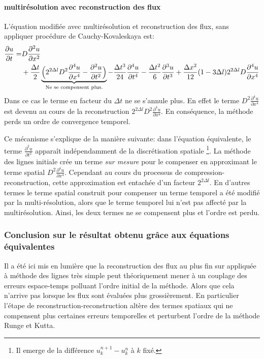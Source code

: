     \paragraph{multirésolution avec reconstruction des flux}
        L'équation modifiée avec multirésolution et reconstruction des flux, sans appliquer procédure de Cauchy-Kovaleskaya est:
        \begin{align}
            \frac{\partial u}{\partial  t} =&D \frac{\partial^{2} u}{\partial x^{2}}\\\notag
            &+ \frac{\Delta t}{2} \underbrace{\Bigl(2^{2 \Delta l} D^{2}           \frac{\partial^{4} u}{\partial x^{4}} -\frac{\partial^{2} u}{\partial t^{2}} \Bigr)}_{\text{Ne se compensent plus.}}
            -\frac{\Delta t^{3}}{24}                          \frac{\partial^{4} u}{\partial t^{4}} 
            - \frac{\Delta t^{2}}{6}                           \frac{\partial^{3} u}{\partial t^{3}}
            +\frac{\Delta x^{2}}{12} (1 - 3\Delta l)    2^{2 \Delta l} D \frac{\partial^{4} u}{\partial x^{4}}
        \end{align}
        Dans ce cas le terme en facteur du $\Delta t$ ne se s'annule plus. En effet le terme $D^{2}\frac{\partial^{4} u}{\partial x^{4}}$ est devenu au cours de la reconstruction
        $2^{2 \Delta l} D^{2}\frac{\partial^{4} u}{\partial x^{4}}$. En conséquence, la méthode perds un ordre de convergence temporel.\par
        Ce mécanisme s'explique de la manière suivante: dans l'équation équivalente, le terme $\frac{\partial^{2} u}{\partial t^{2}}$ apparaît indépendamment de la discrétisation spatiale
        \footnote{Il emerge de la différence $u_k^{n+1} - u_k^{n}$ à $k$ fixé.}. La méthode des lignes initiale crée un terme \textit{sur mesure} pour le compenser en approximant le terme spatial
        $D^{2}\frac{\partial^{4} u}{\partial x^{4}}$. Cependant au cours du processus de compression-reconstruction, cette approximation est entachée d'un facteur $2^{2 \Delta l}$.
        En d'autres termes le terme spatial construit pour compenser un terme temporel a été modifié par la multi-résolution, alors que le terme temporel lui n'est pas affecté par la multirésolution.
        Ainsi, les deux termes ne se compensent plus et l'ordre est perdu.
\subsubsection{Conclusion sur le résultat obtenu grâce aux équations équivalentes}
    Il a été ici mis en lumière que la reconstruction des flux au plus fin sur appliquée à méthode des lignes très simple
    peut théoriquement mener à un couplage des erreurs espace-temps polluant l'ordre initial de la méthode.
    Alors que cela n'arrive pas lorsque les flux sont évaluées plus grossièrement.
    En particulier l'étape de reconstruction-reconstruction altère des termes spatiaux qui ne compensent plus certaines erreurs temporelles et perturbent l'ordre de la méthode Runge et Kutta.